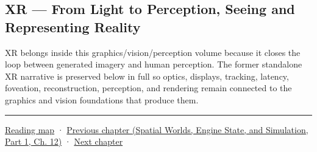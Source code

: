 \subsection{XR --- From Light to Perception, Seeing and Representing Reality}\label{04-visual-computing-ii-ch042-xr-from-light-to-perception-seeing-and-representing-reality}

\hypertarget{04-visual-computing-ii-ch042-xr-from-light-to-perception-seeing-and-representing-reality}{}

XR belongs inside this graphics/vision/perception volume because it closes the loop between generated imagery and human perception. The former standalone XR narrative is preserved below in full so optics, displays, tracking, latency, foveation, reconstruction, perception, and rendering remain connected to the graphics and vision foundations that produce them.

\begin{center}\rule{0.5\linewidth}{0.5pt}\end{center}

\hyperref[volume-reading-map]{Reading map} · \href{../05-Spatial-Worlds-Engine-State-and-Simulation-P01/main.pdf\#nameddest=04-visual-computing-ii-ch041-per-vertex-and-per-corner-mesh-attributes}{Previous chapter (Spatial Worlds, Engine State, and Simulation, Part 1, Ch. 12)} · \hyperref[04-visual-computing-ii-ch043-xr-extended-walkthrough-and-verification-checkpoints]{Next chapter}
